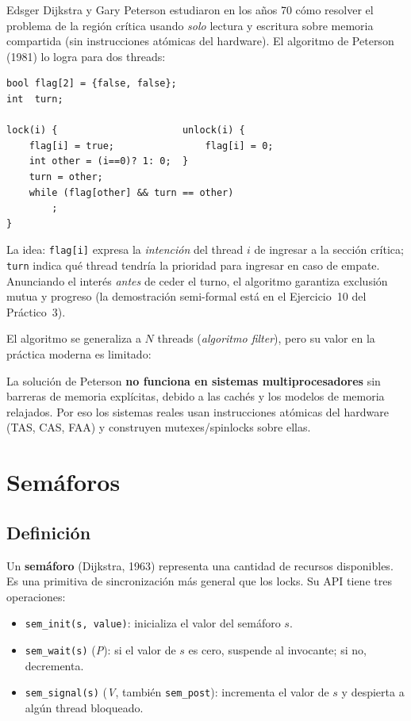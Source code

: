 \documentclass[11pt,a4paper]{article}
\begin{document}
Edsger Dijkstra y Gary Peterson estudiaron en los años 70 cómo
resolver el problema de la región crítica usando \emph{solo} lectura
y escritura sobre memoria compartida (sin instrucciones atómicas del
hardware). El algoritmo de Peterson (1981) lo logra para dos threads:

\begin{lstlisting}[style=cstyle]
bool flag[2] = {false, false};
int  turn;

lock(i) {                      unlock(i) {
    flag[i] = true;                flag[i] = 0;
    int other = (i==0)? 1: 0;  }
    turn = other;
    while (flag[other] && turn == other)
        ;
}
\end{lstlisting}

La idea: \texttt{flag[i]} expresa la \emph{intención} del thread $i$
de ingresar a la sección crítica; \texttt{turn} indica qué thread
tendría la prioridad para ingresar en caso de empate. Anunciando el
interés \emph{antes} de ceder el turno, el algoritmo garantiza
exclusión mutua y progreso (la demostración semi-formal está en el
Ejercicio~10 del Práctico~3).

El algoritmo se generaliza a $N$ threads (\emph{algoritmo filter}),
pero su valor en la práctica moderna es limitado:

\begin{importante}
La solución de Peterson \textbf{no funciona en sistemas
multiprocesadores} sin barreras de memoria explícitas, debido a las
cachés y los modelos de memoria relajados. Por eso los sistemas
reales usan instrucciones atómicas del hardware (TAS, CAS, FAA) y
construyen mutexes/spinlocks sobre ellas.
\end{importante}

\section{Semáforos}

\subsection{Definición}

\begin{definicion}
Un \textbf{semáforo} (Dijkstra, 1963) representa una cantidad de
recursos disponibles. Es una primitiva de sincronización más general
que los locks. Su API tiene tres operaciones:
\begin{itemize}[leftmargin=*,nosep]
    \item \texttt{sem\_init(s, value)}: inicializa el valor del
        semáforo $s$.
    \item \texttt{sem\_wait(s)} (\emph{P}): si el valor de $s$ es
        cero, suspende al invocante; si no, decrementa.
    \item \texttt{sem\_signal(s)} (\emph{V}, también
        \texttt{sem\_post}): incrementa el valor de $s$ y despierta a
        algún thread bloqueado.
\end{itemize}
\end{definicion}
\end{document}
